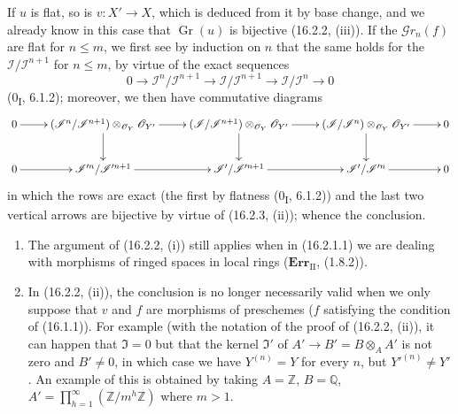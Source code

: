 If $u$ is flat, so is $v:X'\to X$, which is deduced from it by
base change, and we already know in this case that $\operatorname{Gr}(u)$ is
bijective (16.2.2, (iii)). If the $\mathscr{G}r_n(f)$ are flat for
$n\leq m$, we first see by induction on $n$ that the same holds for the
$\mathscr{I}/\mathscr{I}^{n+1}$ for $n\leq m$, by virtue of the exact sequences
\[
  0\longrightarrow\mathscr{I}^n/\mathscr{I}^{n+1}
  \longrightarrow\mathscr{I}/\mathscr{I}^{n+1}
  \longrightarrow\mathscr{I}/\mathscr{I}^n
  \longrightarrow 0
\]
(0\textsubscript{I}, 6.1.2); moreover, we then have commutative diagrams
\[
  \xymatrix{
    0 \ar[r] &
    (\mathscr{I}^n/\mathscr{I}^{n+1})
      \otimes_{\mathcal{O}_Y}\mathcal{O}_{Y'}
      \ar[r]\ar[d] &
    (\mathscr{I}/\mathscr{I}^{n+1})
      \otimes_{\mathcal{O}_Y}\mathcal{O}_{Y'}
      \ar[r]\ar[d] &
    (\mathscr{I}/\mathscr{I}^n)
      \otimes_{\mathcal{O}_Y}\mathcal{O}_{Y'}
      \ar[r]\ar[d] & 0 \\
    0 \ar[r] &
    \mathscr{I}'^n/\mathscr{I}'^{n+1}
      \ar[r] &
    \mathscr{I}'/\mathscr{I}'^{n+1}
      \ar[r] &
    \mathscr{I}'/\mathscr{I}'^n
      \ar[r] & 0
  }
\]
in which the rows are exact (the first by flatness
(0\textsubscript{I}, 6.1.2)) and the last two vertical arrows are
bijective by virtue of (16.2.3, (ii)); whence the conclusion.

\begin{remarks}[16.2.5]
\label{IV.16.2.5}
\begin{enumerate}
\item[(i)] The argument of (16.2.2, (i)) still applies when in
(16.2.1.1) we are dealing with morphisms of ringed spaces in local rings
($\mathbf{Err}_{\mathrm{II}}$, (1.8.2)).
\item[(ii)] In (16.2.2, (ii)), the conclusion is no longer necessarily valid
when we only suppose that $v$ and $f$ are morphisms of preschemes
($f$ satisfying the condition of (16.1.1)). For example (with the notation of the
proof of (16.2.2, (ii)), it can happen that $\mathfrak{I}=0$ but that
the kernel $\mathfrak{I}'$ of $A'\to B'=B\otimes_A A'$ is not zero and
$B'\neq 0$, in which case we have $Y^{(n)}=Y$ for every $n$, but
$Y'^{(n)}\neq Y'$. An example of this is obtained by taking
$A=\mathbb{Z}$, $B=\mathbb{Q}$,
$A'=\prod_{h=1}^{\infty}(\mathbb{Z}/m^h\mathbb{Z})$ where $m>1$.
\end{enumerate}
\end{remarks}

